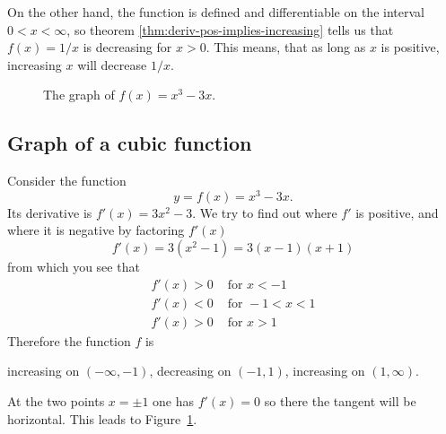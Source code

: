 On the other hand, the function is defined and differentiable on the interval
$0<x<\infty$, so theorem \ref{thm:deriv-pos-implies-increasing} tells us that
$f(x) = 1/x$ is decreasing for $x>0$.  This means, that as long as $x$ is
positive, increasing $x$ will decrease $1/x$.

\begin{figure}[t]
  \centering 

  \bigskip

  \caption{The graph of $f(x) = x^3-3x$.}
  \label{fig:05upAndDown}
\end{figure}

\subsection{Graph of a cubic function}
\label{sec:cubicgraph}
Consider the function
\[
y = f(x) = x^3-3x.
\]
Its derivative is $f'(x) = 3x^2-3$.  We try to find out where $f'$ is positive,
and where it is negative by factoring $f'(x)$
\[
f'(x) = 3(x^2-1)
=3(x-1)(x+1)
\]
from which you see that
\begin{align*}
  f'(x) > 0 &\text{ for }x<-1 \\
  f'(x) < 0 &\text{ for }-1 < x < 1 \\
  f'(x) > 0 &\text{ for } x>1
\end{align*}
Therefore the function $f$ is
\begin{center}
  increasing on $(-\infty, -1)$, \quad decreasing on
  $(-1, 1)$, \quad increasing on
  $(1, \infty)$.
\end{center}
At the two points $x=\pm1$ one has $f'(x)=0$ so there the tangent
will be horizontal.  This leads to Figure~\ref{fig:05upAndDown}.

